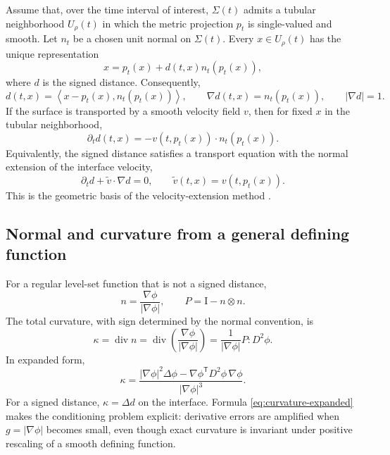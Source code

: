 \documentclass[11pt,a4paper]{article}
\theoremstyle{definition}
\theoremstyle{remark}
\newcommand{\Div}{\operatorname{div}}
\newcommand{\Id}{\mathrm{I}}
\newcommand{\abs}[1]{\left\lvert #1\right\rvert}
\newcommand{\inner}[2]{\left\langle #1,#2\right\rangle}
\begin{document}
Assume that, over the time interval of interest, $\Sigma(t)$ admits a tubular neighborhood $U_{\rho}(t)$ in which the metric projection $p_t$ is single-valued and smooth. Let $n_t$ be a chosen unit normal on $\Sigma(t)$. Every $x\in U_\rho(t)$ has the unique representation
\begin{equation}
  x=p_t(x)+d(t,x)n_t(p_t(x)),
  \label{eq:tubular-decomp}
\end{equation}
where $d$ is the signed distance. Consequently,
\begin{equation}
  d(t,x)=\inner{x-p_t(x)}{n_t(p_t(x))},
  \qquad
  \nabla d(t,x)=n_t(p_t(x)),
  \qquad
  \abs{\nabla d}=1.
\end{equation}
If the surface is transported by a smooth velocity field $v$, then for fixed $x$ in the tubular neighborhood,
\begin{equation}
  \partial_t d(t,x)=-v(t,p_t(x))\cdot n_t(p_t(x)).
  \label{eq:distance-time}
\end{equation}
Equivalently, the signed distance satisfies a transport equation with the normal extension of the interface velocity,
\begin{equation}
  \partial_t d+\widetilde v\cdot\nabla d=0,
  \qquad
  \widetilde v(t,x)=v(t,p_t(x)).
  \label{eq:extended-velocity-distance}
\end{equation}
This is the geometric basis of the velocity-extension method \cite{BotheSoga2026}.

\subsection{Normal and curvature from a general defining function}

For a regular level-set function that is not a signed distance,
\begin{equation}
  n=\frac{\nabla\phi}{\abs{\nabla\phi}},
  \qquad
  P=\Id-n\otimes n.
\end{equation}
The total curvature, with sign determined by the normal convention, is
\begin{equation}
  \kappa=\Div n
  =\Div\left(\frac{\nabla\phi}{\abs{\nabla\phi}}\right)
  =\frac{1}{\abs{\nabla\phi}}P:D^2\phi.
  \label{eq:curvature-general}
\end{equation}
In expanded form,
\begin{equation}
  \kappa
  =\frac{\abs{\nabla\phi}^2\Delta\phi
  -\nabla\phi^{\mathsf T}D^2\phi\,\nabla\phi}
  {\abs{\nabla\phi}^3}.
  \label{eq:curvature-expanded}
\end{equation}
For a signed distance, $\kappa=\Delta d$ on the interface. Formula \eqref{eq:curvature-expanded} makes the conditioning problem explicit: derivative errors are amplified when $g=\abs{\nabla\phi}$ becomes small, even though exact curvature is invariant under positive rescaling of a smooth defining function.
\end{document}
